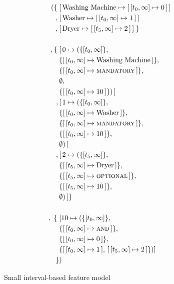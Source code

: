 \begin{figure}
  \begin{align*}
    ( \{ \; & \mapping{\text{Washing Machine}}{\intervalmapping{t_0}{\forever}{0}} \\
       ,\; & \mapping{\text{Washer}}{\intervalmapping{t_0}{\forever}{1}} \\
       ,\; & \mapping{\text{Dryer}}{\intervalmapping{t_5}{\forever}{2}}\; \} \\
       \\
       ,\{\; & \mapping{0}{(\{ \interval{t_0}{\forever}\} ,\, \\
             & \{\intervalmapping{t_0}{\forever}{\text{Washing Machine}}\} ,\, \\
             & \{\intervalmapping{t_0}{\forever}{\mandatory{}}\} ,\, \\
             &  \emptyset ,\, \\ 
             & \{\intervalmapping{t_0}{\forever}{10}\} ) } \\
             ,\, & \mapping{1}{(\{\interval{t_0}{\forever}\} ,\, \\
             & \{\intervalmapping{t_0}{\forever}{\text{Washer}}\} ,\, \\
             & \{\intervalmapping{t_0}{\forever}{\mandatory{}}\} ,\, \\
             &  \{\intervalmapping{t_0}{\forever}{10}\} ,\, \\ 
             & \emptyset)} \\
             ,\, & \mapping{2}{(\{\interval{t_5}{\forever}\} ,\, \\
             & \{\intervalmapping{t_5}{\forever}{\text{Dryer}}\} ,\, \\
             & \{\intervalmapping{t_5}{\forever}{\optional{}}\} ,\, \\
             &  \{\intervalmapping{t_5}{\forever}{10}\} ,\, \\ 
             & \emptyset)} \}\\
             \\
               ,\; \{ \; & [ 10 \mapsto (\{\interval{t_0}{\forever}\} ,\, \\
                         & \{\intervalmapping{t_0}{\forever}{\andtype{}}\} ,\, \\
                         & \{\intervalmapping{t_0}{\forever}{0}\} ,\, \\
                         & \{\intervalmapping{t_0}{\forever}{1},\, \intervalmapping{t_5}{\forever}{2}\} ) ]\\
    \}&)\\
  \end{align*}
  \caption{Small interval-based feature model}
  \label{ex:washing-machine}
\end{figure}

